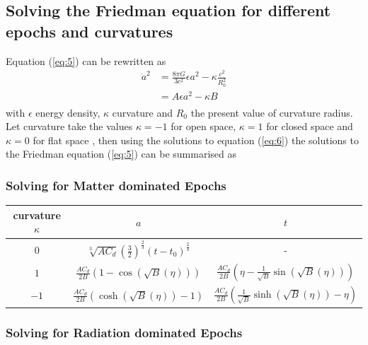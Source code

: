 \documentclass[a4paper, 11pt]{FSKH_623_Report}
\numberwithin{equation}{section}
\newcommand{\brac}[1]{\left(#1\right)}
\begin{document}
\subsection{Solving the Friedman equation for different epochs and curvatures}
Equation (\ref{eq:5}) can be rewritten as \citep{notes4}
\begin{equation}
\begin{split}\label{eq:CurvFriedman}
\dot{a}^{2} &= \frac{8\pi G}{3c^{2}}\epsilon a^{2}-\kappa\frac{c^{2}}{R_{0}^{2}}\\
&= A\epsilon a^{2}-\kappa B\\
\end{split}
\end{equation}
with $\epsilon$ energy density, $\kappa$ curvature and $R_{0}$ the present value of curvature radius. Let curvature take the values $\kappa=-1$ for open space, $\kappa=1$ for closed space and $\kappa=0$ for flat space \citep{Curv}, then using the solutions to equation (\ref{eq:6}) the solutions to the Friedman equation (\ref{eq:5}) can be summarised as
\subsubsection{Solving for Matter dominated Epochs}
\begin{table}[H]
\centering
\begin{tabular}{| c | c | c |}
\hline\hline
curvature $\kappa$ &$a$  &$t$ \\
\hline\hline
$0$  &$\sqrt[3]{AC_{d}}\brac{\frac{3}{2}}^\frac{2}{3}\brac{t-t_{0}}^{\frac{2}{3}}$ & - \\
\hline
$1$  &$\frac{AC_{d}}{2B}\brac{1-\cos\brac{\sqrt{B}\brac{\eta}}}$ & $\frac{AC_{d}}{2B}\brac{\eta-\frac{1}{\sqrt{B}}\sin\brac{\sqrt{B}\brac{\eta}}}$ \\
\hline
$-1$  & $\frac{AC_{d}}{2B}\brac{\cosh\brac{\sqrt{B}\brac{\eta}}-1}$ & $\frac{AC_{d}}{2B}\brac{\frac{1}{\sqrt{B}}\sinh\brac{\sqrt{B}\brac{\eta}}-\eta}$ \\
\hline
\end{tabular}
\end{table}
\subsubsection{Solving for Radiation dominated Epochs}
\end{document}
